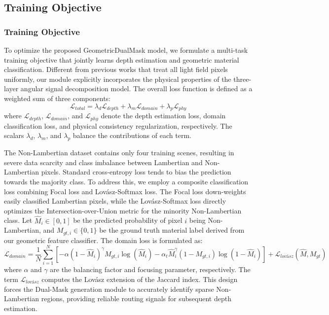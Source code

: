 \subsection{Training Objective}

\subsubsection{Training Objective}

To optimize the proposed GeometricDualMask model, we formulate a multi-task training objective that jointly learns depth estimation and geometric material classification. Different from previous works that treat all light field pixels uniformly, our module explicitly incorporates the physical properties of the three-layer angular signal decomposition model. The overall loss function is defined as a weighted sum of three components:
\begin{equation}
\label{eq:eq22}
\mathcal{L}_{total} = \lambda_{d} \mathcal{L}_{depth} + \lambda_{m} \mathcal{L}_{domain} + \lambda_{p} \mathcal{L}_{phy}
\end{equation}
where $\mathcal{L}_{depth}$, $\mathcal{L}_{domain}$, and $\mathcal{L}_{phy}$ denote the depth estimation loss, domain classification loss, and physical consistency regularization, respectively. The scalars $\lambda_{d}$, $\lambda_{m}$, and $\lambda_{p}$ balance the contributions of each term.

The Non-Lambertian dataset contains only four training scenes, resulting in severe data scarcity and class imbalance between Lambertian and Non-Lambertian pixels. Standard cross-entropy loss tends to bias the prediction towards the majority class. To address this, we employ a composite classification loss combining Focal loss and Lovász-Softmax loss. The Focal loss down-weights easily classified Lambertian pixels, while the Lovász-Softmax loss directly optimizes the Intersection-over-Union metric for the minority Non-Lambertian class. Let $\hat{M}_i \in [0, 1]$ be the predicted probability of pixel $i$ being Non-Lambertian, and $M_{gt, i} \in \{0, 1\}$ be the ground truth material label derived from our geometric feature classifier. The domain loss is formulated as:
\begin{equation}
\label{eq:eq23}
\mathcal{L}_{domain} = \frac{1}{N} \sum_{i=1}^{N} \left[ -\alpha (1 - \hat{M}_i)^{\gamma} M_{gt, i} \log(\hat{M}_i) - \alpha_t \hat{M}_i^{\gamma} (1 - M_{gt, i}) \log(1 - \hat{M}_i) \right] + \mathcal{L}_{lovász}(\hat{M}, M_{gt})
\end{equation}
where $\alpha$ and $\gamma$ are the balancing factor and focusing parameter, respectively. The term $\mathcal{L}_{lovász}$ computes the Lovász extension of the Jaccard index. This design forces the Dual-Mask generation module to accurately identify sparse Non-Lambertian regions, providing reliable routing signals for subsequent depth estimation.

